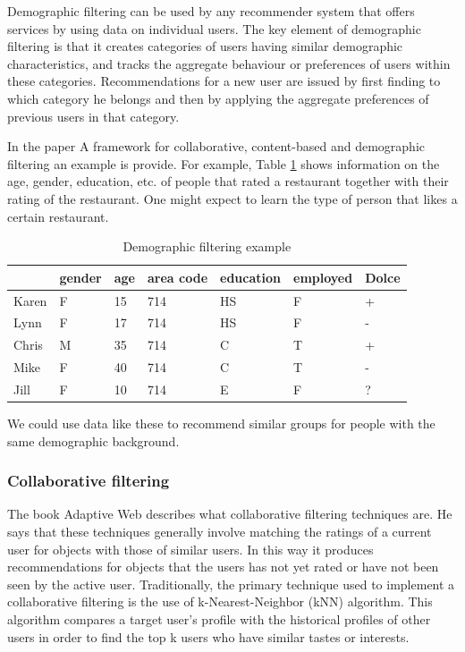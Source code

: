 Demographic filtering can be used by any recommender system that offers services by using data on individual users. 
The key element of demographic filtering is that it creates categories of users having similar demographic characteristics, and tracks the aggregate behaviour or preferences of users within these categories. 
Recommendations for a new user are issued by first finding to which category he belongs and then by applying the aggregate preferences of previous users in that category.

In the paper A framework for collaborative, content-based and demographic filtering\cite{pazzani1999framework} an example is provide. 
For example, Table \ref{table:dfexample}  shows information on the age, gender, education, etc. of people that rated
a restaurant together with their rating of the restaurant. 
One might expect to learn the type of person that likes a certain restaurant. \\ 

\begin{table}[h]
    \begin{tabular}{|l|l|l|l|l|l||l|}
    \hline
    ~     & gender & age & area code & education & employed & Dolce \\ \hline
    Karen & F      & 15  & 714       & HS        & F        & +     \\ \hline
    Lynn  & F      & 17  & 714       & HS        & F        & -     \\ \hline
    Chris & M      & 35  & 714       & C         & T        & +     \\ \hline
    Mike  & F      & 40  & 714       & C         & T        & -     \\ \hline
    Jill  & F      & 10  & 714       & E         & F        & ?     \\ \hline
    \end{tabular}
\caption{Demographic filtering example}
\label{table:dfexample}
\end{table}

\noindent We could use data like these to recommend similar groups for people with the same demographic background.

\subsubsection*{Collaborative filtering}
The book Adaptive Web \citep{Peter2007} describes what collaborative filtering techniques are.
He says that these techniques generally involve matching the ratings of a current user for objects with those of similar users.
In this way it produces recommendations for objects that the users has not yet rated or have not been seen by the active user.
Traditionally, the primary technique used to implement a collaborative filtering is the use of k-Nearest-Neighbor (kNN) algorithm.
This algorithm compares a target user's profile with the historical profiles of other users in order to find the top k users who have similar tastes or interests.

